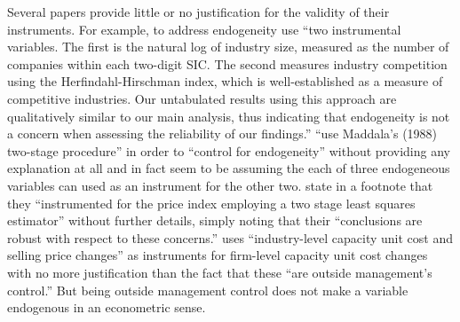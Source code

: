 \documentclass[11pt]{amsart}
\begin{document}
Several papers provide little or no justification for the validity of their instruments. For example, to address endogeneity \citet{Cohen:2014jl} use ``two instrumental variables. The first is the natural log of industry size, measured as the number of companies within each two-digit SIC. The second measures industry competition using the Herfindahl-Hirschman index, which is well-established as a measure of competitive industries. Our untabulated results using this approach are qualitatively similar to our main analysis, thus indicating that endogeneity is not a concern when assessing the reliability of our findings.''
\citet{Vermeer:2014bs} ``use Maddala's (1988) two-stage procedure'' in order to ``control for endogeneity'' without providing any explanation at all and in fact seem to be assuming the each of three endogeneous variables can used as an instrument for the other two.
\citet[p.48]{Fox:2014io} state in a footnote that they ``instrumented for the price index employing a two stage least squares estimator'' without further details, simply noting that their ``conclusions are robust with respect to these concerns.''
\citet{Cannon:2014im} uses ``industry-level capacity unit cost and selling price changes'' as instruments for firm-level capacity unit cost changes with no more justification than the fact that these ``are outside management's control.'' But being outside management control does not make a variable endogenous in an econometric sense.
\end{document}
